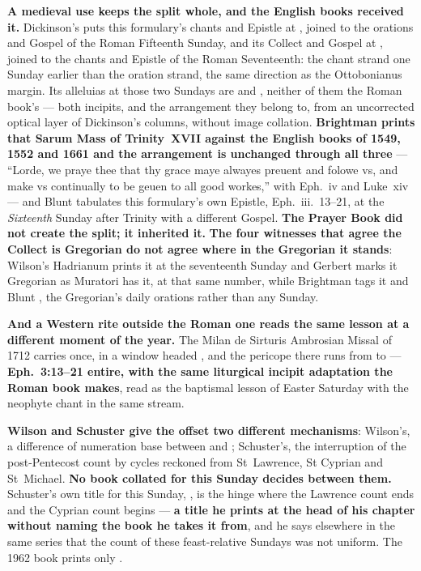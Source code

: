 \textbf{A medieval use keeps the split whole, and the English books received
it.} Dickinson's  puts this formulary's
chants and Epistle at , joined to
the orations and Gospel of the Roman Fifteenth Sunday, and its Collect and
Gospel at , joined to the chants and Epistle of
the Roman Seventeenth: the chant strand one Sunday earlier than the oration
strand, the same direction as the Ottobonianus margin. Its alleluias at those
two Sundays are  and , neither of them the Roman book's --- both incipits, and
the arrangement they belong to, from an uncorrected optical layer of Dickinson's
columns, without image collation. \textbf{Brightman prints that Sarum
Mass of Trinity~XVII against the English books of 1549, 1552 and 1661 and the
arrangement is unchanged through all three} --- ``Lorde, we
praye thee that thy grace maye alwayes preuent and folowe vs, and make vs
continually to be geuen to all good workes,'' with Eph.~iv and Luke~xiv --- and
Blunt tabulates this formulary's own Epistle, Eph.~iii.~13--21, at the
\emph{Sixteenth} Sunday after Trinity with a different Gospel. \textbf{The
Prayer Book did not create the split; it inherited it.} \textbf{The four
witnesses that agree the Collect is Gregorian do not agree where in the
Gregorian it stands}: Wilson's Hadrianum prints it at the seventeenth Sunday
and Gerbert marks it Gregorian as Muratori has it, at that same number, while
Brightman tags it  and Blunt
, the Gregorian's daily orations rather than
any Sunday.

\textbf{And a Western rite outside the Roman one reads the same lesson at a
different moment of the year.} The Milan de Sirturis Ambrosian Missal of 1712
carries  once, in a window headed , and the pericope there runs from  to  ---
\textbf{Eph.~3:13--21 entire, with the same liturgical incipit adaptation the
Roman book makes}, read as the baptismal lesson of Easter Saturday with the
neophyte chant  in the same stream.

\textbf{Wilson and Schuster give the offset two different mechanisms}:
Wilson's, a difference of numeration base between  and
; Schuster's, the interruption of the
post-Pentecost count by cycles reckoned from St~Lawrence, St Cyprian and
St~Michael. \textbf{No book collated for this Sunday decides between them.} Schuster's own title for this Sunday, , is the hinge where the Lawrence count ends and the
Cyprian count begins --- \textbf{a title he prints at the head of his chapter
without naming the book he takes it from}, and he says elsewhere in the same
series that the count of these feast-relative Sundays was not uniform. The 1962
book prints only .

